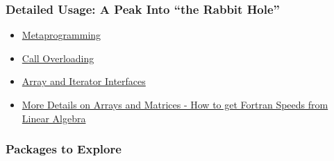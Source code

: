 \documentclass[11pt]{article}
\begin{document}
\subsubsection{Detailed Usage: A Peak Into ``the Rabbit
Hole''}\label{detailed-usage-a-peak-into-the-rabbit-hole}

\begin{itemize}
\itemsep1pt\parskip0pt
\item
  \href{http://ucidatascienceinitiative.github.io/IntroToJulia/Slides/Metaprogramming}{Metaprogramming}
\item
  \href{http://ucidatascienceinitiative.github.io/IntroToJulia/Slides/CallOverloading}{Call
  Overloading}
\item
  \href{http://ucidatascienceinitiative.github.io/IntroToJulia/Slides/ArrayIteratorInterfaces}{Array
  and Iterator Interfaces}
\item
  \href{http://ucidatascienceinitiative.github.io/IntroToJulia/Slides/ArraysAndMatrices}{More
  Details on Arrays and Matrices - How to get Fortran Speeds from Linear
  Algebra}
\end{itemize}

\subsubsection{Packages to Explore}\label{packages-to-explore}
\end{document}
